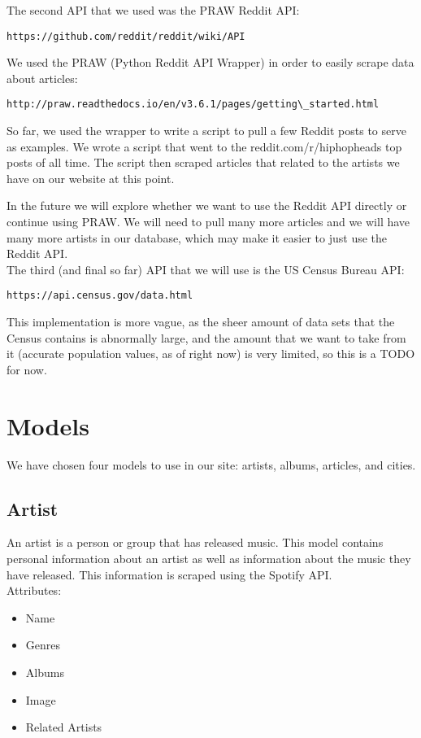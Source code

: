 \documentclass{scrartcl}
\begin{document}
\noindent
The second API that we used was the PRAW Reddit API:
\begin{verbatim}https://github.com/reddit/reddit/wiki/API\end{verbatim}

\noindent
We used the PRAW (Python Reddit API Wrapper) in order to easily scrape data about articles:
\begin{verbatim}http://praw.readthedocs.io/en/v3.6.1/pages/getting\_started.html\end{verbatim}

So far, we used the wrapper to write a script to pull a few Reddit posts to serve as examples. We wrote a script that went to the reddit.com/r/hiphopheads top posts of all time. The script then scraped articles that related to the artists we have on our website at this point.

In the future we will explore whether we want to use the Reddit API directly or continue using PRAW. We will need to pull many more articles and we will have many more artists in our database, which may make it easier to just use the Reddit API.\\

\noindent
The third (and final so far) API that we will use is the US Census Bureau API:
\begin{verbatim}https://api.census.gov/data.html\end{verbatim}

This implementation is more vague, as the sheer amount of data sets that the Census contains is abnormally large, and the amount that we want to take from it (accurate population values, as of right now) is very limited, so this is a TODO for now.

\section{Models}
We have chosen four models to use in our site: artists, albums, articles, and cities.

\subsection{Artist}
An artist is a person or group that has released music. This model contains personal information about an artist as well as information about the music they have released. This information is scraped using the Spotify API.\\

Attributes:
\begin{itemize}
    \item Name
    \item Genres
    \item Albums
    \item Image
    \item Related Artists
\end{itemize}
\end{document}
